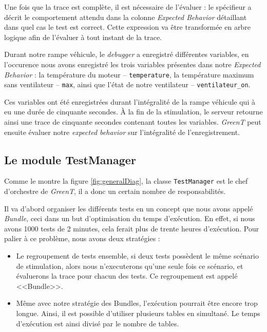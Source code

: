 Une fois que la trace est complète, il est nécessaire de l'évaluer : le spécifieur a décrit le comportement attendu dans la colonne \textit{Expected Behavior} détaillant dans quel cas le test est correct. Cette expression va être transformée en arbre logique afin de l'évaluer à tout instant de la trace. 

\begin{exemple}
	Durant notre rampe véhicule, le \textit{debugger} a enregistré différentes variables, en l'occurence nous avons enregistré les trois variables présentes dans notre \textit{Expected Behavior} : la température	du moteur -- \texttt{temperature}, la température maximum sans ventilateur -- \texttt{max}, ainsi que l'état de notre ventilateur -- \texttt{ventilateur\_on}.
	
	Ces variables ont été enregistrées durant l'intégralité de la rampe véhicule qui à eu une durée de cinquante secondes. À la fin de la stimulation, le serveur retourne ainsi une trace de cinquante secondes contenant toutes les variables. \textit{GreenT} peut ensuite évaluer notre \textit{expected behavior} sur l'intégralité de l'enregistrement.
\end{exemple}
\subsection{Le module TestManager}\label{testManager}
Comme le montre la figure \ref{fig:generalDiag}, la classe \texttt{TestManager} est le chef d'orchestre de \textit{GreenT}, il a donc un certain nombre de responsabilités. 

Il va d'abord organiser les différents tests en un concept que nous avons appelé \textit{Bundle}, ceci dans un but d'optimisation du temps d'exécution. En effet, si nous avons 1000 tests de 2 minutes, cela ferait plus de trente heures d'exécution. Pour palier à ce problème, nous avons deux stratégies :
\begin{itemize}
	\item Le regroupement de tests ensemble, si deux tests possèdent le même scénario de stimulation, alors nous n'executerons qu'une seule fois ce scénario, et évaluerons la trace pour chacun des tests. Ce regroupement est appelé <<Bundle>>.
	\item Même avec notre stratégie des Bundles, l'exécution pourrait être encore trop longue. Ainsi, il est possible d'utiliser plusieurs tables en simultané. Le temps d'exécution est ainsi divisé par le nombre de tables. 
\end{itemize}

